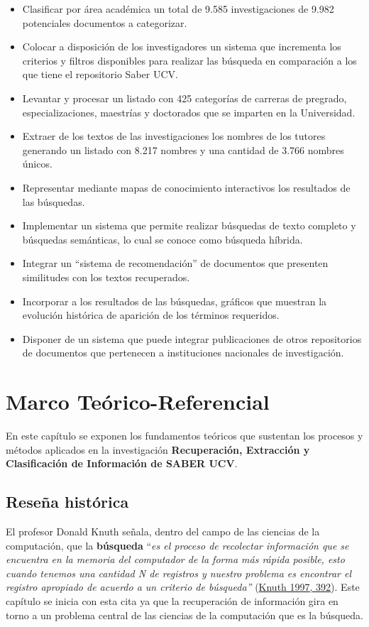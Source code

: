 \documentclass[
  12pt,
  openany]{book}
\begin{document}
\begin{itemize}
\item
  Clasificar por área académica un total de 9.585 investigaciones de 9.982 potenciales documentos a categorizar.
\item
  Colocar a disposición de los investigadores un sistema que incrementa los criterios y filtros disponibles para realizar las búsqueda en comparación a los que tiene el repositorio Saber UCV.
\item
  Levantar y procesar un listado con 425 categorías de carreras de pregrado, especializaciones, maestrías y doctorados que se imparten en la Universidad.
\item
  Extraer de los textos de las investigaciones los nombres de los tutores generando un listado con 8.217 nombres y una cantidad de 3.766 nombres únicos.
\item
  Representar mediante mapas de conocimiento interactivos los resultados de las búsquedas.
\item
  Implementar un sistema que permite realizar búsquedas de texto completo y búsquedas semánticas, lo cual se conoce como búsqueda híbrida.
\item
  Integrar un ``sistema de recomendación'' de documentos que presenten similitudes con los textos recuperados.
\item
  Incorporar a los resultados de las búsquedas, gráficos que muestran la evolución histórica de aparición de los términos requeridos.
\item
  Disponer de un sistema que puede integrar publicaciones de otros repositorios de documentos que pertenecen a instituciones nacionales de investigación.
\end{itemize}

\hypertarget{teorico}{%
\chapter{Marco Teórico-Referencial}\label{teorico}}

En este capítulo se exponen los fundamentos teóricos que sustentan los procesos y métodos aplicados en la investigación \textbf{Recuperación, Extracción y Clasificación de Información de SABER UCV}.

\hypertarget{alghist}{%
\section{Reseña histórica}\label{alghist}}

El profesor Donald Knuth señala, dentro del campo de las ciencias de la computación, que la \textbf{búsqueda} ``\emph{es el proceso de recolectar información que se encuentra en la memoria del computador de la forma más rápida posible, esto cuando tenemos una cantidad N de registros y nuestro problema es encontrar el registro apropiado de acuerdo a un criterio de búsqueda''} (\protect\hyperlink{ref-knuth1997}{Knuth 1997, 392}). Este capítulo se inicia con esta cita ya que la recuperación de información gira en torno a un problema central de las ciencias de la computación que es la búsqueda.
\end{document}
